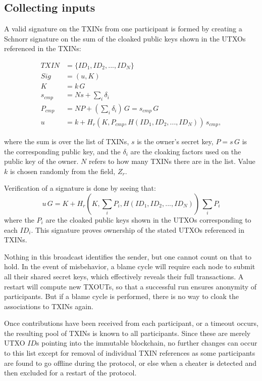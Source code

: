 \documentclass[8pt,fleqn,openany]{book}
\begin{document}
\subsection{Collecting inputs} 
A valid signature on the TXINs from one participant is formed by creating a Schnorr signature on the sum of the cloaked public keys shown in the UTXOs referenced in the TXINs:

\begin{align*}
TXIN &= \{ID_1, ID_2, ..., ID_N\}\\
Sig &= (u, K)\\
K &= k \, G \\
s_{cmp} &= N s + \sum_i{\delta_i}\\
P_{cmp} &= N P + (\sum_i{\delta_i})\, G = s_{cmp} \, G\\
u &= k + H_r(K, P_{cmp}, H(ID_1, ID_2, ..., ID_N)) \, s_{cmp},
\end{align*}

where the sum is over the list of TXINs, $s$ is the owner’s secret key, $P = s \, G$ is the corresponding public key, and the $\delta_i$ are the cloaking factors used on the public key of the owner. $N$ refers to how many TXINs there are in the list. Value $k$ is chosen randomly from the field, $Z_r$. 

Verification of a signature is done by seeing that:
$$u \, G = K + H_r(K, \sum_i{P_i}, H(ID_1, ID_2, ..., ID_N)) \, \sum_i{P_i}$$
where the $P_i$ are the cloaked public keys shown in the UTXOs corresponding to each $ID_i$. This signature proves ownership of the stated UTXOs referenced in TXINs.

Nothing in this broadcast identifies the sender, but one cannot count on that to hold. In the event of misbehavior, a blame cycle will require each node to submit all their shared secret keys, which effectively reveals their full transactions. A restart will compute new TXOUTs, so that a successful run ensures anonymity of participants. But if a blame cycle is performed, there is no way to cloak the associations to TXINs again.

Once contributions have been received from each participant, or a timeout occurs, the resulting pool of TXINs is known to all participants. Since these are merely UTXO $ID$s pointing into the immutable blockchain, no further changes can occur to this list except for removal of individual TXIN references as some participants are found to go offline during the protocol, or else when a cheater is detected and then excluded for a restart of the protocol.
\end{document}
